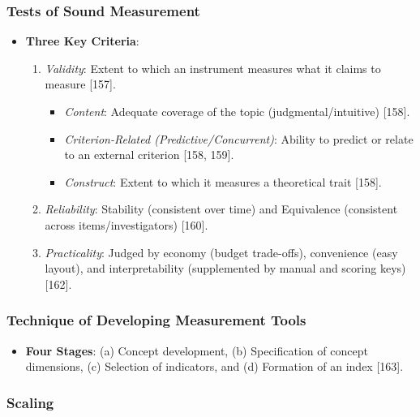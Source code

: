 \documentclass[
]{article}
\providecommand{\tightlist}{%
  \setlength{\itemsep}{0pt}\setlength{\parskip}{0pt}}
\begin{document}
\subsubsection{Tests of Sound
Measurement}\label{tests-of-sound-measurement}

\begin{itemize}
\tightlist
\item
  \textbf{Three Key Criteria}:

  \begin{enumerate}
  \def\labelenumi{\arabic{enumi}.}
  \tightlist
  \item
    \emph{Validity}: Extent to which an instrument measures what it
    claims to measure {[}157{]}.

    \begin{itemize}
    \tightlist
    \item
      \emph{Content}: Adequate coverage of the topic
      (judgmental/intuitive) {[}158{]}.
    \item
      \emph{Criterion-Related (Predictive/Concurrent)}: Ability to
      predict or relate to an external criterion {[}158, 159{]}.
    \item
      \emph{Construct}: Extent to which it measures a theoretical trait
      {[}158{]}.
    \end{itemize}
  \item
    \emph{Reliability}: Stability (consistent over time) and Equivalence
    (consistent across items/investigators) {[}160{]}.
  \item
    \emph{Practicality}: Judged by economy (budget trade-offs),
    convenience (easy layout), and interpretability (supplemented by
    manual and scoring keys) {[}162{]}.
  \end{enumerate}
\end{itemize}

\subsubsection{Technique of Developing Measurement
Tools}\label{technique-of-developing-measurement-tools}

\begin{itemize}
\tightlist
\item
  \textbf{Four Stages}: (a) Concept development, (b) Specification of
  concept dimensions, (c) Selection of indicators, and (d) Formation of
  an index {[}163{]}.
\end{itemize}

\subsubsection{Scaling}\label{scaling}
\end{document}
